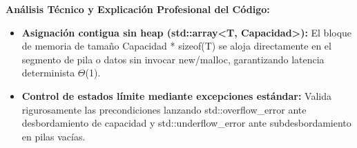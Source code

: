 \documentclass[11pt,letterpaper]{article}
\begin{document}
\noindent\textbf{\color{ipnguinda}Análisis Técnico y Explicación Profesional del Código:}\par\vspace{-2pt}
\begin{itemize}
\setlength{\itemsep}{2pt}\setlength{\parskip}{0pt}
  \item \textbf{Asignación contigua sin heap (std::array<T, Capacidad>): }El bloque de memoria de tamaño Capacidad * sizeof(T) se aloja directamente en el segmento de pila o datos sin invocar new/malloc, garantizando latencia determinista $\Theta$(1).
  \item \textbf{Control de estados límite mediante excepciones estándar: }Valida rigurosamente las precondiciones lanzando std::overflow\_error ante desbordamiento de capacidad y std::underflow\_error ante subdesbordamiento en pilas vacías.
\end{itemize}
\end{document}
